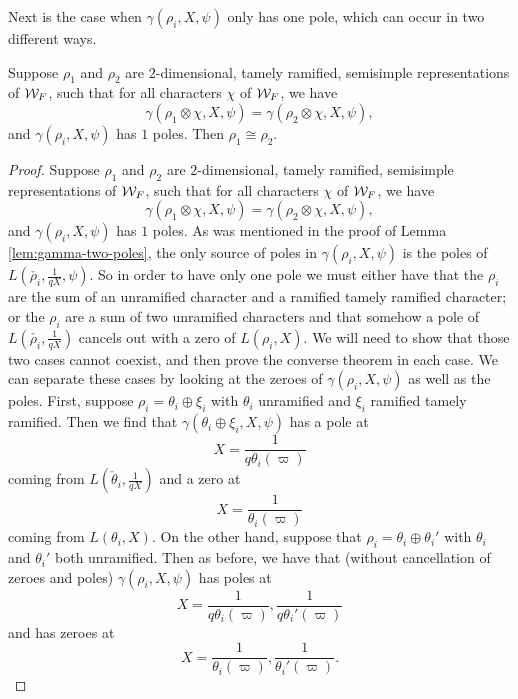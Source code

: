 Next is the case when $\gamma(\rho_i, X,\psi)$ only has one pole, which can occur in two different ways. 

\begin{lemma}
  \label{lem:gamma-one-pole}
  Suppose $\rho_1$ and $\rho_2$ are $2$-dimensional, tamely ramified, semisimple representations of $\mathcal{W}_F$, such that for all characters $\chi$ of $\mathcal{W}_F$, we have
  \[\gamma(\rho_1 \otimes \chi,X,\psi) = \gamma(\rho_2 \otimes \chi,X,\psi),\]
  and $\gamma(\rho_i,X,\psi)$ has $1$ poles.
  Then $\rho_1 \cong \rho_2$.
\end{lemma}

\begin{proof}
  Suppose $\rho_1$ and $\rho_2$ are $2$-dimensional, tamely ramified, semisimple representations of $\mathcal{W}_F$, such that for all characters $\chi$ of $\mathcal{W}_F$, we have
  \[\gamma(\rho_1 \otimes \chi,X,\psi) = \gamma(\rho_2 \otimes \chi,X,\psi),\]
  and $\gamma(\rho_i,X,\psi)$ has $1$ poles.
  As was mentioned in the proof of Lemma \ref{lem:gamma-two-poles}, the only source of poles in $\gamma(\rho_i,X,\psi)$ is the poles of $L(\check{\rho_i},\frac{1}{qX},\psi)$.
  So in order to have only one pole we must either have that the $\rho_i$ are the sum of an unramified character and a ramified tamely ramified character; or the $\rho_i$ are a sum of two unramified characters and that somehow a pole of $L(\check{\rho_i},\frac{1}{qX})$ cancels out with a zero of $L(\rho_i,X)$.
  We will need to show that those two cases cannot coexist, and then prove the converse theorem in each case.
  We can separate these cases by looking at the zeroes of $\gamma(\rho_i,X,\psi)$ as well as the poles.
  First, suppose $\rho_i = \theta_i \oplus \xi_i$ with $\theta_i$ unramified and $\xi_i$ ramified tamely ramified.
  Then we find that $\gamma(\theta_i \oplus \xi_i,X,\psi)$ has a pole at
  \[X= \frac{1}{q\theta_i(\varpi)}\]
  coming from $L(\check{\theta}_i,\frac{1}{qX})$ and a zero at
  \[X = \frac{1}{\theta_i(\varpi)}\]
  coming from $L(\theta_i,X)$.
  On the other hand, suppose that $\rho_i = \theta_i \oplus \theta_i'$ with $\theta_i$ and $\theta_i'$ both unramified.
  Then as before, we have that (without cancellation of zeroes and poles)  $\gamma(\rho_i,X,\psi)$ has poles at
  \[X = \frac{1}{q\theta_i(\varpi)}, \frac{1}{q\theta_i'(\varpi)}\]
  and has zeroes at
  \[X = \frac{1}{\theta_i(\varpi)}, \frac{1}{\theta_i'(\varpi)}.\]



\end{proof}
